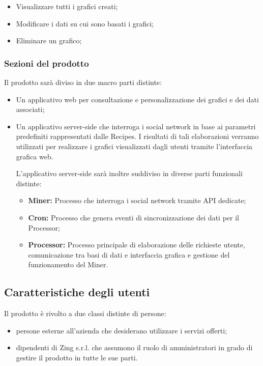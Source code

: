 \begin{itemize}
\item Visualizzare tutti i grafici creati;
\item Modificare i dati su cui sono basati i grafici;
\item Eliminare un grafico;
\end{itemize}

\subsubsection{Sezioni del prodotto}
Il prodotto sarà diviso in due macro parti distinte:

\begin{itemize}
\item Un applicativo web per consultazione e personalizzazione dei grafici e dei dati associati;
\item Un applicativo server-side che interroga i social network in base ai parametri predefiniti rappresentati dalle Recipes. I risultati di tali elaborazioni verranno utilizzati per realizzare i grafici visualizzati dagli utenti tramite l'interfaccia grafica web.

L'applicativo server-side sarà inoltre suddiviso in diverse parti funzionali distinte:
\begin{itemize}
\item \textbf{Miner:} Processo che interroga i social network tramite API dedicate;
\item \textbf{Cron:} Processo che genera eventi di sincronizzazione dei dati per il Processor;
\item \textbf{Processor:} Processo principale di elaborazione delle richieste utente, comunicazione tra basi di dati e interfaccia grafica e gestione del funzionamento del Miner.
\end{itemize}

\end{itemize}

\subsection{Caratteristiche degli utenti}
Il prodotto è rivolto a due classi distinte di persone:

\begin{itemize}
\item persone esterne all'azienda che desiderano utilizzare i servizi offerti;
\item dipendenti di Zing s.r.l. che assumono il ruolo di amministratori in grado di gestire il prodotto in tutte le sue parti.
\end{itemize}

